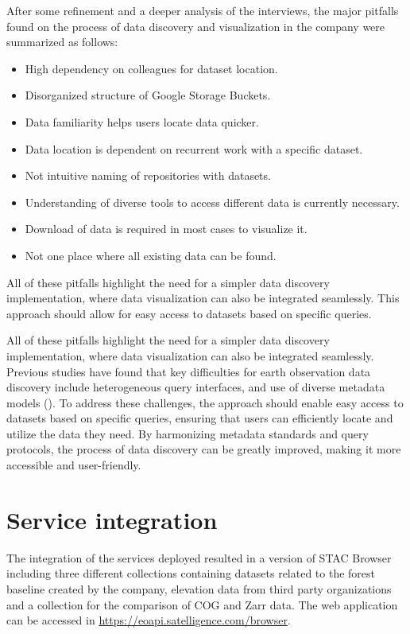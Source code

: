 \documentclass[
  oneside,
  open=any]{scrbook}
\providecommand{\tightlist}{%
  \setlength{\itemsep}{0pt}\setlength{\parskip}{0pt}}\usepackage{longtable,booktabs,array}
\begin{document}
After some refinement and a deeper analysis of the interviews, the major
pitfalls found on the process of data discovery and visualization in the
company were summarized as follows:

\begin{itemize}
\tightlist
\item
  High dependency on colleagues for dataset location.
\item
  Disorganized structure of Google Storage Buckets.
\item
  Data familiarity helps users locate data quicker.
\item
  Data location is dependent on recurrent work with a specific dataset.
\item
  Not intuitive naming of repositories with datasets.
\item
  Understanding of diverse tools to access different data is currently
  necessary.
\item
  Download of data is required in most cases to visualize it.
\item
  Not one place where all existing data can be found.
\end{itemize}

All of these pitfalls highlight the need for a simpler data discovery
implementation, where data visualization can also be integrated
seamlessly. This approach should allow for easy access to datasets based
on specific queries.

All of these pitfalls highlight the need for a simpler data discovery
implementation, where data visualization can also be integrated
seamlessly. Previous studies have found that key difficulties for earth
observation data discovery include heterogeneous query interfaces, and
use of diverse metadata models
(). To address these challenges, the approach should enable easy
access to datasets based on specific queries, ensuring that users can
efficiently locate and utilize the data they need. By harmonizing
metadata standards and query protocols, the process of data discovery
can be greatly improved, making it more accessible and user-friendly.

\section{Service integration}\label{service-integration}

The integration of the services deployed resulted in a version of STAC
Browser including three different collections containing datasets
related to the forest baseline created by the company, elevation data
from third party organizations and a collection for the comparison of
COG and Zarr data. The web application can be accessed in
\href{https://eoapi.satelligence.com/browser/?.language=en}{https://eoapi.satelligence.com/browser}.
\end{document}
